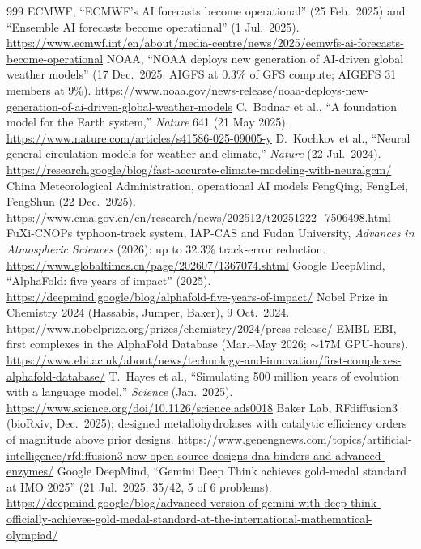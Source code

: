 \begin{thebibliography}{999}
 ECMWF, ``ECMWF's AI forecasts become operational'' (25 Feb.\ 2025) and ``Ensemble AI forecasts become operational'' (1 Jul.\ 2025). \url{https://www.ecmwf.int/en/about/media-centre/news/2025/ecmwfs-ai-forecasts-become-operational}
 NOAA, ``NOAA deploys new generation of AI-driven global weather models'' (17 Dec.\ 2025: AIGFS at 0.3\% of GFS compute; AIGEFS 31 members at 9\%). \url{https://www.noaa.gov/news-release/noaa-deploys-new-generation-of-ai-driven-global-weather-models}
 C.~Bodnar et al., ``A foundation model for the Earth system,'' \emph{Nature} 641 (21 May 2025). \url{https://www.nature.com/articles/s41586-025-09005-y}
 D.~Kochkov et al., ``Neural general circulation models for weather and climate,'' \emph{Nature} (22 Jul.\ 2024). \url{https://research.google/blog/fast-accurate-climate-modeling-with-neuralgcm/}
 China Meteorological Administration, operational AI models FengQing, FengLei, FengShun (22 Dec.\ 2025). \url{https://www.cma.gov.cn/en/research/news/202512/t20251222_7506498.html}
 FuXi-CNOPs typhoon-track system, IAP-CAS and Fudan University, \emph{Advances in Atmospheric Sciences} (2026): up to 32.3\% track-error reduction. \url{https://www.globaltimes.cn/page/202607/1367074.shtml}
 Google DeepMind, ``AlphaFold: five years of impact'' (2025). \url{https://deepmind.google/blog/alphafold-five-years-of-impact/}
 Nobel Prize in Chemistry 2024 (Hassabis, Jumper, Baker), 9 Oct.\ 2024. \url{https://www.nobelprize.org/prizes/chemistry/2024/press-release/}
 EMBL-EBI, first complexes in the AlphaFold Database (Mar.--May 2026; $\sim$17M GPU-hours). \url{https://www.ebi.ac.uk/about/news/technology-and-innovation/first-complexes-alphafold-database/}
 T.~Hayes et al., ``Simulating 500 million years of evolution with a language model,'' \emph{Science} (Jan.\ 2025). \url{https://www.science.org/doi/10.1126/science.ads0018}
 Baker Lab, RFdiffusion3 (bioRxiv, Dec.\ 2025); designed metallohydrolases with catalytic efficiency orders of magnitude above prior designs. \url{https://www.genengnews.com/topics/artificial-intelligence/rfdiffusion3-now-open-source-designs-dna-binders-and-advanced-enzymes/}
 Google DeepMind, ``Gemini Deep Think achieves gold-medal standard at IMO 2025'' (21 Jul.\ 2025: 35/42, 5 of 6 problems). \url{https://deepmind.google/blog/advanced-version-of-gemini-with-deep-think-officially-achieves-gold-medal-standard-at-the-international-mathematical-olympiad/}

\end{thebibliography}
